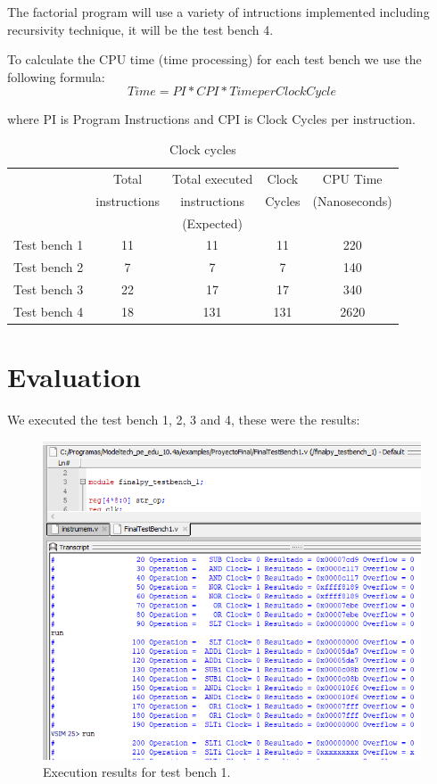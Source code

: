 \documentclass[conference]{IEEEtran}
\begin{document}
The factorial program will use a variety of  intructions implemented including recursivity technique, it will be the test bench 4.

To calculate the CPU time \cite{b5} (time processing) for each test bench we use the following formula:
\[Time = PI * CPI * Time per Clock Cycle\] 

where PI is Program Instructions and CPI is Clock Cycles per instruction. 

\begin{table}[h]
\caption{Clock cycles} %
\begin{center}
\begin{tabular}{|c|c|c|c|c|}
\hline
&Total&Total executed&Clock&CPU Time\\
&instructions&instructions&Cycles&(Nanoseconds)\\
&&(Expected)&&\\
\hline
Test bench 1&11&11&11&220\\
\hline
Test bench 2&7&7&7&140\\
\hline
Test bench 3&22&17&17&340\\
\hline
Test bench 4&18&131&131&2620\\
\hline
\end{tabular}
\label{tab_test3}
\end{center}
\end{table}

\section{Evaluation}
We executed the test bench 1, 2, 3 and 4, these were the results:

\begin{figure}[h]
\includegraphics[scale=0.41]{ModelSim_testbench1_clock_cycles.png}
\caption{Execution results for test bench 1.}
\label{result1}
\end{figure}
\end{document}
